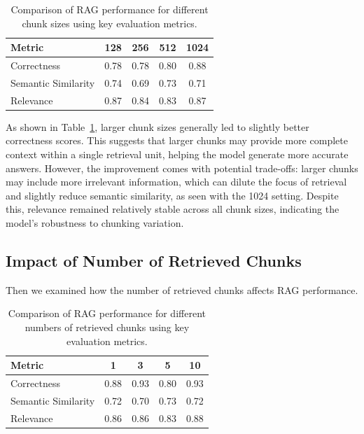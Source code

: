 \documentclass[fleqn,moreauthors,10pt]{ds_report}
\begin{document}
\begin{table}[ht]
\caption{Comparison of RAG performance for different chunk sizes using key evaluation metrics.}
\centering
\begin{tabular}{lcccc}
\toprule
\textbf{Metric} & \textbf{128} & \textbf{256} & \textbf{512} & \textbf{1024} \\
\midrule
Correctness & 0.78 & 0.78 & 0.80 & 0.88 \\
Semantic Similarity & 0.74 & 0.69 & 0.73 & 0.71 \\
Relevance & 0.87 & 0.84 & 0.83 & 0.87 \\
\bottomrule
\end{tabular}
\label{tab:rag_chunk_key_metrics}
\end{table}

As shown in Table~\ref{tab:rag_chunk_key_metrics}, larger chunk sizes generally led to slightly better correctness scores. This suggests that larger chunks may provide more complete context within a single retrieval unit, helping the model generate more accurate answers. However, the improvement comes with potential trade-offs: larger chunks may include more irrelevant information, which can dilute the focus of retrieval and slightly reduce semantic similarity, as seen with the 1024 setting. Despite this, relevance remained relatively stable across all chunk sizes, indicating the model's robustness to chunking variation.

\subsection*{Impact of Number of Retrieved Chunks}
Then we examined how the number of retrieved chunks affects RAG performance.

\begin{table}[ht]
\caption{Comparison of RAG performance for different numbers of retrieved chunks using key evaluation metrics.}
\centering
\begin{tabular}{lcccc}
\toprule
\textbf{Metric} & \textbf{1} & \textbf{3} & \textbf{5} & \textbf{10} \\
\midrule
Correctness & 0.88 & 0.93 & 0.80 & 0.93 \\
Semantic Similarity & 0.72 & 0.70 & 0.73 & 0.72 \\
Relevance & 0.86 & 0.86 & 0.83 & 0.88 \\
\bottomrule
\end{tabular}
\label{tab:rag_chunk_retrieval_metrics}
\end{table}
\end{document}
